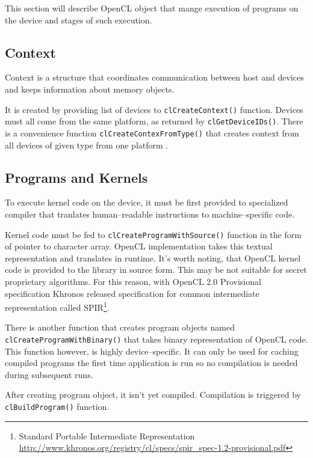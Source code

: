 This section will describe OpenCL object that mange execution of programs on the
device and stages of such execution.

\subsection{Context}

Context is a structure that coordinates communication between host and devices
and keeps information about memory objects. 

It is created by providing list of devices to \texttt{clCreateContext()}
function. Devices must all come from the same platform, as returned by
\texttt{clGetDeviceIDs()}. There is a convenience function \texttt{clCreateContexFromType()}
that creates context from all devices of given type from one platform \parencite{openclspec}.

\subsection{Programs and Kernels}

To execute kernel code on the device, it must be first provided to specialized
compiler that tranlates human--readable instructions to machine--specific code.

Kernel code must be fed to \texttt{clCreate\-Program\-WithSource()} function in the form of
pointer to character array. OpenCL implementation takes this textual
representation and translates in runtime. It's worth noting, that OpenCL kernel
code is provided to the library in source form. This may be not suitable for
secret proprietary algorithms. For this reason, with OpenCL 2.0 Provisional
specification Khronos released specification for common intermediate
representation called SPIR\footnote{Standard Portable Intermediate Representation
  \url{http://www.khronos.org/registry/cl/specs/spir_spec-1.2-provisional.pdf}}.

There is another function that creates program objects named\\
\texttt{clCreate\-Program\-With\-Binary()} that takes binary representation of OpenCL
code. This function however, is highly device--specific. It can only be used
for caching compiled programs the first time application is run so no compilation
is needed during subsequent runs.

After creating program object, it isn't yet compiled. Compilation is triggered
by \texttt{cl\-Build\-Program()} function.

